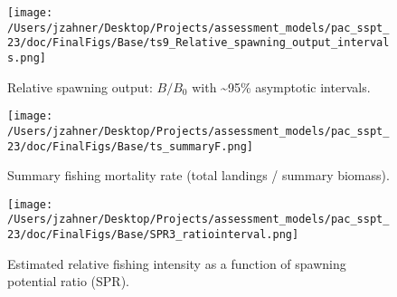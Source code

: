 \documentclass[11pt,
  letterpaper,
]{article}
\begin{document}
\begin{figure}
{\centering
\texttt{[image: /Users/jzahner/Desktop/Projects/assessment\_models/pac\_sspt\_23/doc/FinalFigs/Base/ts9\_Relative\_spawning\_output\_intervals.png]}
}
\caption{Relative spawning output: $B/B_0$ with \sim  95\% asymptotic intervals.\label{fig:relspawnout}}
\end{figure}

\begin{figure}
{\centering
\texttt{[image: /Users/jzahner/Desktop/Projects/assessment\_models/pac\_sspt\_23/doc/FinalFigs/Base/ts\_summaryF.png]}
}
\caption{Summary fishing mortality rate (total landings / summary biomass).\label{fig:summary_f}}
\end{figure}

\begin{figure}
{\centering
\texttt{[image: /Users/jzahner/Desktop/Projects/assessment\_models/pac\_sspt\_23/doc/FinalFigs/Base/SPR3\_ratiointerval.png]}
}
\caption{Estimated relative fishing intensity as a function of spawning potential ratio (SPR).\label{fig:spr_trajectory}}
\end{figure}
\end{document}
